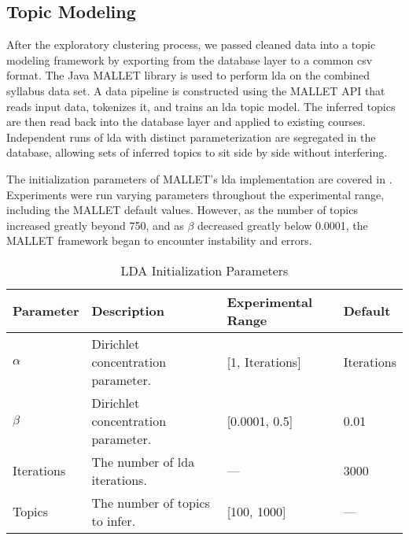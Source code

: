 
\subsection{Topic Modeling}
\label{sec:topic-modeling}

After the exploratory clustering process, we passed cleaned data into a topic modeling framework by exporting from the database layer to a common \ac{csv} format.
The Java MALLET library is used to perform \acf{lda} on the combined syllabus data set.
A data pipeline is constructed using the MALLET API that reads input data, tokenizes it, and trains an \ac{lda} topic model.
The inferred topics are then read back into the database layer and applied to existing courses.
Independent runs of \ac{lda} with distinct parameterization are segregated in the database, allowing sets of inferred topics to sit side by side without interfering.


The initialization parameters of MALLET's \ac{lda} implementation are covered in .
Experiments were run varying parameters throughout the experimental range, including the MALLET default values.
However, as the number of topics increased greatly beyond 750, and as $\beta$ decreased greatly below 0.0001, the MALLET framework began to encounter instability and errors.


\begin{table*}[ht]
\centering
\begin{tabular}{llll}
\toprule
Parameter  & Description & Experimental Range & Default \\
\midrule
$\alpha$   & Dirichlet concentration parameter. & [1, Iterations] & Iterations \\
$\beta$    & Dirichlet concentration parameter. & [0.0001, 0.5] & 0.01 \\
Iterations & The number of \ac{lda} iterations. & --- & 3000 \\
Topics     & The number of topics to infer. & [100, 1000] & --- \\
\bottomrule
\end{tabular}
\caption{LDA Initialization Parameters\label{table:lda-parameters}}
\end{table*}


